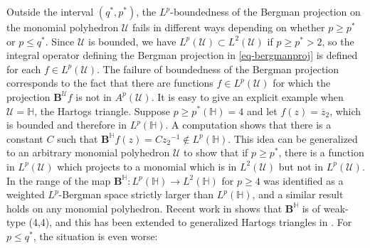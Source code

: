 \documentclass[letterpaper,11pt,reqno]{amsart}
\theoremstyle{plain}
\theoremstyle{definition}
\theoremstyle{remark}
\theoremstyle{remark}
\numberwithin{equation}{section}
\newcommand{\ol}{\overline}
\newcommand{\h}{{\mathbb H}}
\newcommand{\Uu}{\mathscr{U}}
\begin{document}
Outside the interval $(q^*,p^*)$, the $L^p$-boundedness of the Bergman projection on the monomial polyhedron $\Uu$ fails in different ways depending on whether $p \geq p^*$ or $p \leq  q^*$.
Since $\Uu$ is bounded, we have $L^p(\Uu)\subset L^2(\Uu)$ if $p \geq p^* > 2$, so the integral operator defining the Bergman projection in \eqref{eq-bergmanproj} is defined for each $f\in L^p(\Uu)$. 
The failure of boundedness of the Bergman projection corresponds to the fact that  there are functions $f\in L^p(\Uu)$ for which the projection $\bm{B}^{\Uu}f$ is not in $A^p(\Uu)$. 
It is easy to give  an explicit example when $\Uu=\h$, the Hartogs triangle.
Suppose $p\ge p^*(\h) = 4$ and let $f(z) = \ol{z}_2$, which is  bounded and therefore in $L^p(\h)$. 
A computation shows that there is a constant $C$ such that  $\bm{B}^\h f(z) = C{z_2}^{-1}\notin L^p(\h)$. 
This idea can be generalized to an arbitrary monomial polyhedron $\Uu$ to show that if $p\geq p^*$, there is a function in $L^p(\Uu)$ which projects to a monomial which is in $L^2(\Uu)$ but not in $L^p(\Uu)$. 
In \cite{chakzeytuncu} the range of the map $\bm{B}^\h:L^p(\h)\to L^2(\h)$ for $p\geq 4$ was identified as a weighted $L^p$-Bergman space strictly larger than $L^p(\h)$, and a similar result holds on any monomial polyhedron. 
Recent work in \cite{HuoWick2020a} shows that $\bm{B}^\h$ is of weak-type (4,4), and this has been extended to generalized Hartogs triangles in \cite{koenig2}. 
For $p \le q^*$, the situation is even worse:
\end{document}

